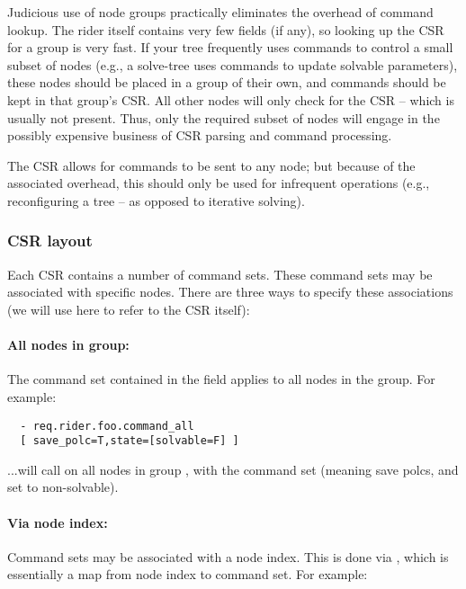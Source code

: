   Judicious use of node groups practically eliminates the overhead of command
  lookup. The rider itself contains very few fields (if any), so looking up the
  CSR for a group is very fast. If your tree frequently uses commands to
  control a small subset of nodes (e.g., a solve-tree uses commands to update
  solvable parameters), these nodes should be placed in a group of their own,
  and commands should be kept in that group's CSR. All other nodes will only
  check for the  CSR -- which is usually not present. Thus, only the
  required subset of nodes will engage in the possibly expensive business of
  CSR parsing and command processing.
  
  The  CSR allows for commands to be sent to any node; but because of
  the associated overhead, this should only be used for infrequent operations
  (e.g., reconfiguring a tree -- as opposed to iterative solving).

\subsubsection{CSR layout}
  
  Each CSR contains a number of command sets. These command sets may be
  associated with specific nodes. There are three ways to specify these
  associations (we will use  here to refer to the CSR itself):

  \paragraph{All nodes in group:} The command set contained in the field
   applies to all nodes in the group. For example:

\begin{verbatim}
  - req.rider.foo.command_all
  [ save_polc=T,state=[solvable=F] ]  
\end{verbatim}

  ...will call  on all nodes in group , with the
  command set \qq{[save\_polc=T,state=[solvable=F]} (meaning save polcs, and set
  to non-solvable).

  \paragraph{Via node index:} Command sets may be associated with a node index.
  This is done via , which is essentially
  a map from node index to command set. For example:

